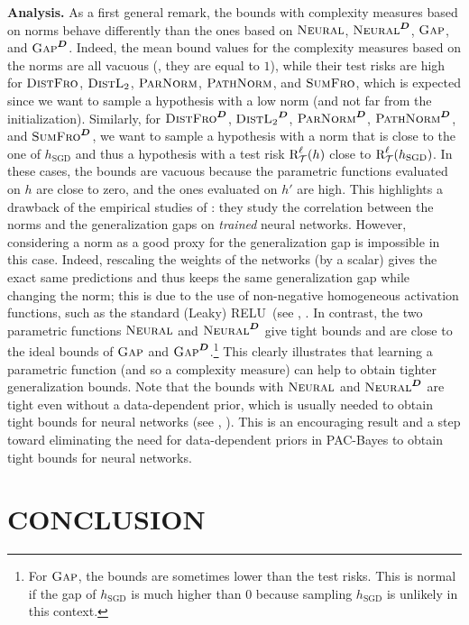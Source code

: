 \documentclass[twoside]{article}
\theoremstyle{plain}
\begin{document}
\textbf{Analysis.}
As a first general remark, the bounds with complexity measures based on norms behave differently than the ones based on $\text{\sc Neural}$, $\text{\sc Neural}^{\boldsymbol{D}}$, $\text{\sc Gap}$, and $\text{\sc Gap}^{\boldsymbol{D}}$.
Indeed, the mean bound values for the complexity measures based on the norms are all vacuous (\ie, they are equal to $1$), while their test risks are high for $\text{\sc DistFro}$, $\text{\sc DistL$_2$}$, $\text{\sc ParNorm}$, $\text{\sc PathNorm}$, and $\text{\sc SumFro}$, which is expected since we want to sample a hypothesis with a low norm (and not far from the initialization).
Similarly, for $\text{\sc DistFro}^{\boldsymbol{D}}$, $\text{\sc DistL$_2$}^{\boldsymbol{D}}$, $\text{\sc ParNorm}^{\boldsymbol{D}}$, $\text{\sc PathNorm}^{\boldsymbol{D}}$, and $\text{\sc SumFro}^{\boldsymbol{D}}$, we want to sample a hypothesis with a norm that is close to the one of $h_{\text{SGD}}$ and thus a hypothesis with a test risk $\text{R}^{\ell}_{\mathcal{T}}(h)$ close to $\text{R}^{\ell}_{\mathcal{T}}(h_{\text{SGD}})$.
In these cases, the bounds are vacuous because the parametric functions evaluated on $h$ are close to zero, and the ones evaluated on $h'$ are high.
This highlights a drawback of the empirical studies of \citet{jiang2020fantastic,dziugaite2020search}: they study the correlation between the norms and the generalization gaps on {\it trained} neural networks.
However, considering a norm as a good proxy for the generalization gap is impossible in this case. 
Indeed, rescaling the weights of the networks (by a scalar) gives the exact same predictions and thus keeps the same generalization gap while changing the norm; this is due to the use of non-negative homogeneous activation functions, such as the standard (Leaky) RELU~(see \eg, \citep{neyshabur2015path,dinh2017sharp}.
In contrast, the two parametric functions $\text{\sc Neural}$ and $\text{\sc Neural}^{\boldsymbol{D}}$ give tight bounds and are close to the ideal bounds of $\text{\sc Gap}$ and $\text{\sc Gap}^{\boldsymbol{D}}$.\footnote{For $\text{\sc Gap}$, the bounds are sometimes lower than the test risks.
This is normal if the gap of $h_{\text{SGD}}$ is much higher than $0$ because sampling $h_{\text{SGD}}$ is unlikely in this context.}
This clearly illustrates that learning a parametric function (and so a complexity measure) can help to obtain tighter generalization bounds.
Note that the bounds with $\text{\sc Neural}$ and $\text{\sc Neural}^{\boldsymbol{D}}$ are tight even without a data-dependent prior, which is usually needed to obtain tight bounds for neural networks (see \eg, \citep{dziugaite2017computing,dziugaite2021role,perezortiz2021tighter,viallard2024general}).
This is an encouraging result and a step toward eliminating the need for data-dependent priors in PAC-Bayes to obtain tight bounds for neural networks.

\section{CONCLUSION}
\label{sec:conclu}
\end{document}
